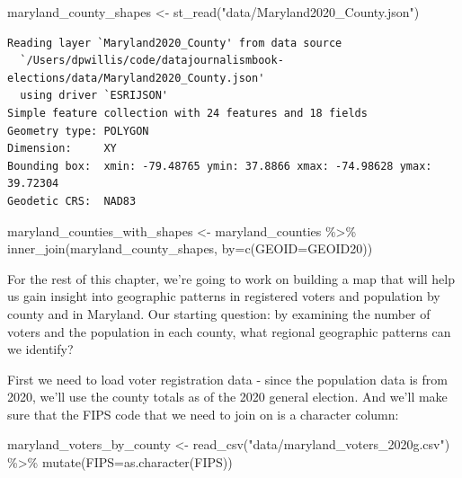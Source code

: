 \documentclass[
  letterpaper,
  DIV=11,
  numbers=noendperiod]{scrreprt}
\newenvironment{Shaded}{\begin{snugshade}}{\end{snugshade}}
\newcommand{\AttributeTok}[1]{\textcolor[rgb]{0.40,0.45,0.13}{#1}}
\newcommand{\FunctionTok}[1]{\textcolor[rgb]{0.28,0.35,0.67}{#1}}
\newcommand{\NormalTok}[1]{\textcolor[rgb]{0.00,0.23,0.31}{#1}}
\newcommand{\OtherTok}[1]{\textcolor[rgb]{0.00,0.23,0.31}{#1}}
\newcommand{\SpecialCharTok}[1]{\textcolor[rgb]{0.37,0.37,0.37}{#1}}
\newcommand{\StringTok}[1]{\textcolor[rgb]{0.13,0.47,0.30}{#1}}
\begin{document}
\begin{Shaded}
\begin{Highlighting}[]
\NormalTok{maryland\_county\_shapes }\OtherTok{\textless{}{-}} \FunctionTok{st\_read}\NormalTok{(}\StringTok{"data/Maryland2020\_County.json"}\NormalTok{)}
\end{Highlighting}
\end{Shaded}

\begin{verbatim}
Reading layer `Maryland2020_County' from data source 
  `/Users/dpwillis/code/datajournalismbook-elections/data/Maryland2020_County.json' 
  using driver `ESRIJSON'
Simple feature collection with 24 features and 18 fields
Geometry type: POLYGON
Dimension:     XY
Bounding box:  xmin: -79.48765 ymin: 37.8866 xmax: -74.98628 ymax: 39.72304
Geodetic CRS:  NAD83
\end{verbatim}

\begin{Shaded}
\begin{Highlighting}[]
\NormalTok{maryland\_counties\_with\_shapes }\OtherTok{\textless{}{-}}\NormalTok{ maryland\_counties }\SpecialCharTok{\%\textgreater{}\%} \FunctionTok{inner\_join}\NormalTok{(maryland\_county\_shapes, }\AttributeTok{by=}\FunctionTok{c}\NormalTok{(}\StringTok{\textquotesingle{}GEOID\textquotesingle{}}\OtherTok{=}\StringTok{\textquotesingle{}GEOID20\textquotesingle{}}\NormalTok{))}
\end{Highlighting}
\end{Shaded}

For the rest of this chapter, we're going to work on building a map that
will help us gain insight into geographic patterns in registered voters
and population by county and in Maryland. Our starting question: by
examining the number of voters and the population in each county, what
regional geographic patterns can we identify?

First we need to load voter registration data - since the population
data is from 2020, we'll use the county totals as of the 2020 general
election. And we'll make sure that the FIPS code that we need to join on
is a character column:

\begin{Shaded}
\begin{Highlighting}[]
\NormalTok{maryland\_voters\_by\_county }\OtherTok{\textless{}{-}} \FunctionTok{read\_csv}\NormalTok{(}\StringTok{"data/maryland\_voters\_2020g.csv"}\NormalTok{) }\SpecialCharTok{\%\textgreater{}\%} \FunctionTok{mutate}\NormalTok{(}\AttributeTok{FIPS=}\FunctionTok{as.character}\NormalTok{(FIPS))}
\end{Highlighting}
\end{Shaded}
\end{document}
